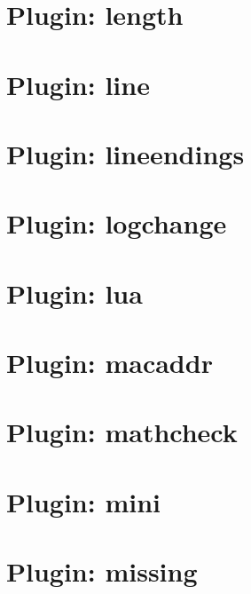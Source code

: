 \let\mypdfximage\pdfximage\def\pdfximage{\immediate\mypdfximage}\documentclass[twoside]{book}
\newcommand{\+}{\discretionary{\mbox{\scriptsize$\hookleftarrow$}}{}{}}
\begin{document}
\chapter{Plugin\+: length}
\label{md_src_plugins_length_README}

\chapter{Plugin\+: line}
\label{md_src_plugins_line_README}

\chapter{Plugin\+: lineendings}
\label{md_src_plugins_lineendings_README}

\chapter{Plugin\+: logchange}
\label{md_src_plugins_logchange_README}

\chapter{Plugin\+: lua}
\label{md_src_plugins_lua_README}

\chapter{Plugin\+: macaddr}
\label{md_src_plugins_macaddr_README}

\chapter{Plugin\+: mathcheck}
\label{md_src_plugins_mathcheck_README}

\chapter{Plugin\+: mini}
\label{md_src_plugins_mini_README}

\chapter{Plugin\+: missing}
\label{md_src_plugins_missing_README}

\end{document}
